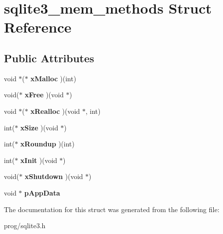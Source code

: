 \hypertarget{structsqlite3__mem__methods}{}\section{sqlite3\+\_\+mem\+\_\+methods Struct Reference}
\label{structsqlite3__mem__methods}
\subsection*{Public Attributes}
\begin{DoxyCompactItemize}
\item 
\mbox{\label{structsqlite3__mem__methods_a19aee06ad5c1c7041f55725b6adb2b18}} 
void $\ast$($\ast$ {\bfseries x\+Malloc} )(int)
\item 
\mbox{\label{structsqlite3__mem__methods_a17d4fe3177f86bd7b559ecadaa343ee8}} 
void($\ast$ {\bfseries x\+Free} )(void $\ast$)
\item 
\mbox{\label{structsqlite3__mem__methods_a82ef8b50d6b9920c1dadb3257cf36a3a}} 
void $\ast$($\ast$ {\bfseries x\+Realloc} )(void $\ast$, int)
\item 
\mbox{\label{structsqlite3__mem__methods_a703ec736e9ce21fd43b9602bcd07fa8e}} 
int($\ast$ {\bfseries x\+Size} )(void $\ast$)
\item 
\mbox{\label{structsqlite3__mem__methods_aaf22c6bca12dc6a3f5851e2b6b59835d}} 
int($\ast$ {\bfseries x\+Roundup} )(int)
\item 
\mbox{\label{structsqlite3__mem__methods_a870eddbe27d9062ed2fb49ba13233501}} 
int($\ast$ {\bfseries x\+Init} )(void $\ast$)
\item 
\mbox{\label{structsqlite3__mem__methods_ae3b1f92553e714484515409eefec5c2f}} 
void($\ast$ {\bfseries x\+Shutdown} )(void $\ast$)
\item 
\mbox{\label{structsqlite3__mem__methods_a390f66d08d5a480544e919f64d7713de}} 
void $\ast$ {\bfseries p\+App\+Data}
\end{DoxyCompactItemize}


The documentation for this struct was generated from the following file\+:\begin{DoxyCompactItemize}
\item 
prog/sqlite3.\+h\end{DoxyCompactItemize}
